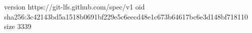 version https://git-lfs.github.com/spec/v1
oid sha256:3c42143bd5a1518b0691bf229e5c6eecd48e1c673b64617bc6e3d148bf718110
size 3339
